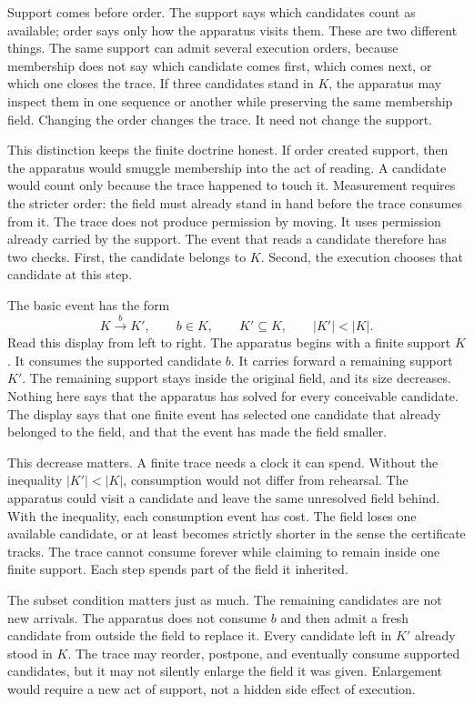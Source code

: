 Support comes before order. The support says which candidates count as available; order says only how the apparatus visits them. These are two different things. The same support can admit several execution orders,
because membership does not say which candidate comes first, which comes next,
or which one closes the trace. If three candidates stand in \(K\), the
apparatus may inspect them in one sequence or another while preserving the same
membership field. Changing the order changes the trace. It need not change the
support.

This distinction keeps the finite doctrine honest. If order created support,
then the apparatus would smuggle membership into the act of reading. A
candidate would count only because the trace happened to touch it. Measurement
requires the stricter order: the field must already stand in hand before the
trace consumes from it. The trace does not produce permission by moving. It
uses permission already carried by the support. The event that reads a
candidate therefore has two checks. First, the candidate belongs to \(K\).
Second, the execution chooses that candidate at this step.

The basic event has the form
\[
  K \xrightarrow{\,b\,} K',
  \qquad
  b \in K,
  \qquad
  K' \subseteq K,
  \qquad
  |K'| < |K|.
\]
Read this display from left to right. The apparatus begins with a finite
support \(K\). It consumes the supported candidate \(b\). It carries forward a
remaining support \(K'\). The remaining support stays inside the original
field, and its size decreases. Nothing here says that the apparatus has solved
for every conceivable candidate. The display says that one finite event has
selected one candidate that already belonged to the field, and that the event
has made the field smaller.

This decrease matters. A finite trace needs a clock it can spend. Without the
inequality \(|K'| < |K|\), consumption would not differ from rehearsal. The
apparatus could visit a candidate and leave the same unresolved field behind.
With the inequality, each consumption event has cost. The field loses one
available candidate, or at least becomes strictly shorter in the sense the
certificate tracks. The trace cannot consume forever while claiming to remain
inside one finite support. Each step spends part of the field it inherited.

The subset condition matters just as much. The remaining candidates are not
new arrivals. The apparatus does not consume \(b\) and then admit a fresh
candidate from outside the field to replace it. Every candidate left in \(K'\)
already stood in \(K\). The trace may reorder, postpone, and eventually
consume supported candidates, but it may not silently enlarge the field it was
given. Enlargement would require a new act of support, not a hidden side
effect of execution.

